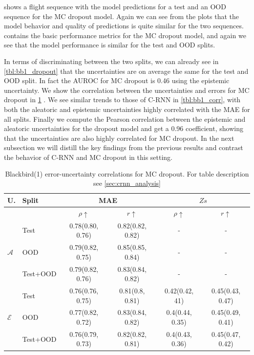  shows a flight sequence with the model predictions for a test and an OOD sequence for the MC dropout model. Again we can see from the plots that the model behavior and quality of predictions is quite similar for the two sequences.  contains the basic performance metrics for the MC dropout model, and again we see that the model performance is similar for the test and OOD splits.

In terms of discriminating between the two splits, we can already see in \cref{tbl:bb1_dropout} that the uncertainties are on average the same for the test and OOD split. In fact the AUROC for MC dropout is 0.46 using the epistemic uncertainty. We show the correlation between the uncertainties and errors for MC dropout in \cref{tbl:bb1_dropout_corr} . We see similar trends to those of C-RNN in \cref{tbl:bb1_corr}, with both the aleatoric and epistemic uncertainties highly correlated with the MAE for all splits. Finally we compute the Pearson correlation between the epistemic and aleatoric uncertainties for the dropout model and get a 0.96 coefficient, showing that the uncertainties are also highly correlated for MC dropout. In the next subsection we will distill the key findings from the previous results and contrast the behavior of C-RNN and MC dropout in this setting.

\begin{table}[ht]
\centering
    \begin{tabular}{l l c c c c}  
        \toprule
        U. & Split & \multicolumn{2}{c}{MAE} & \multicolumn{2}{c}{$Zs$}\\
        \midrule
        & & $\rho \uparrow$ & $r \uparrow$ & $\rho \uparrow$ & $r \uparrow$ \\
        \multirow{3}{*}{$\mathcal{A}$} 
            & Test     & 0.78(0.80, 0.76) & 0.82(0.82, 0.82) & - & - \\  
            & OOD      & 0.79(0.82, 0.75) & 0.85(0.85, 0.84) & - & - \\  
            & Test+OOD & 0.79(0.82, 0.76) & 0.83(0.84, 0.82) & - & - \\ 

        \midrule
        \multirow{3}{*}{$\mathcal{E}$} 
            & Test     & 0.76(0.76, 0.75) & 0.81(0.8, 0.81) &  0.42(0.42, 41)  & 0.45(0.43, 0.47) \\  
            & OOD      & 0.77(0.82, 0.72) & 0.83(0.84, 0.82) &  0.4(0.44, 0.35) & 0.45(0.49, 0.41) \\
            & Test+OOD & 0.76(0.79, 0.73) & 0.82(0.82, 0.81) &  0.4(0.43, 0.36) & 0.45(0.47, 0.42) \\ 

        \toprule
    \end{tabular}
    \caption[Blackbird(1) error-uncertainty correlations for MC dropout]{Blackbird(1) error-uncertainty correlations for MC dropout. For table description see \cref{sec:crnn_analysis}}
    \label{tbl:bb1_dropout_corr}
\end{table}

